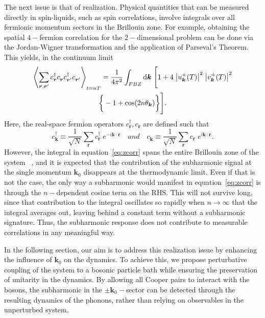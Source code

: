 \documentclass[preprint,5p,times,twocolumn]{elsarticle}
\newcommand{\bmk}{\bm{k}}
\newcommand{\bmr}{\bm{r}}
\newcommand{\bmrp}{\bm{r}^\prime}
\begin{document}
The next issue is that of realization. Physical quantities that can be measured directly in spin-liquids, such as spin correlations, involve integrals over all fermionic momentum sectors in the Brillouin zone. For example, obtaining the spatial $4-$fermion correlation for the $2-$dimensional problem can be done via the Jordan-Wigner transformation and the application of Parseval's Theorem. This yields, in the continuum limit ~\citep{mbeng_quantum_2020}
\begin{multline}
\expval{\sum_{\bmr,\bmrp}c^\dagger_{\bmr}c^{\;}_{\bmr}c^\dagger_{\bmrp}c^{\;}_{\bmrp}}_{t=nT} = \frac{1}{4\pi^2}\int_{FBZ} \mathrm{d}\bmk\; \Bigg[1 + 4\; \abs{u^+_{\bmk}(T)}^2\;\abs{v^+_{\bmk}(T)}^2\\
\bigg\{-1+\cos(2n\theta_{\bmk})\bigg\} \Bigg].
\label{eq:zcorr}
\end{multline}
Here, the real-space fermion operators $c^\dagger_{\bmr}, c_{\bmr}$ are defined such that 
\begin{equation}
    c^\dagger_{\bmk} \equiv \frac{1}{\sqrt{N}}\sum_{\bmr}c^\dagger_{\bmr}\;e^{-i\bmk\cdot\bmr}
    \quad and \quad 
    c^{\;}_{\bmk} \equiv \frac{1}{\sqrt{N}}\sum_{\bmr}c_{\bm{r}}\;e^{i\bmk\cdot\bmr}.
    \label{eq:crcrd}
\end{equation}
However, the integral in equation~\ref{eq:zcorr} spans the entire Brillouin zone of the system ~\citep{Chen_2008}, and it is expected that the contribution of the subharmonic signal at the single momentum $\bmk_0$ disappears at the thermodynamic limit. Even if that is not the case, the only way a subharmonic would manifest in equation~\ref{eq:zcorr} is through the $n-$dependent cosine term on the RHS. This will not survive long, since that contribution to the integral oscillates so rapidly when $n\rightarrow\infty$ that the integral averages out, leaving behind a constant term without a subharmonic signature. Thus, the subharmonic response does not contribute to measurable correlations in any meaningful way. 

In the following section, our aim is to address this realization issue by enhancing the influence of $\bmk_0$ on the dynamics. To achieve this, we propose perturbative coupling of the system to a bosonic particle bath while ensuring the preservation of unitarity in the dynamics. By allowing all Cooper pairs to interact with the bosons, the subharmonic in the $\pm\bmk_0-$sector can be detected through the resulting dynamics of the phonons, rather than relying on observables in the unperturbed system.
\end{document}
